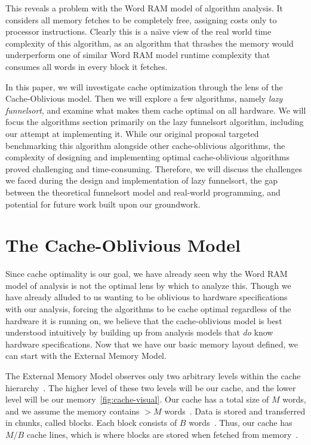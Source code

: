 \documentclass[11pt, letterpaper]{article}
\begin{document}
This reveals a problem with the Word RAM model of algorithm analysis. It considers all memory fetches to be completely free, assigning costs only to processor instructions. Clearly this is a na\"{\i}ve view of the real world time complexity of this algorithm, as an algorithm that thrashes the memory would underperform one of similar Word RAM model runtime complexity that consumes all words in every block it fetches.

In this paper, we will investigate cache optimization through the lens of the Cache-Oblivious model. Then we will explore a few algorithms, namely \textit{lazy funnelsort}, and examine what makes them cache optimal on all hardware. We will focus the algorithms section primarily on the lazy funnelsort algorithm, including our attempt at implementing it. While our original proposal targeted benchmarking this algorithm alongside other cache-oblivious algorithms, the complexity of designing and implementing optimal cache-oblivious algorithms proved challenging and time-consuming. Therefore, we will discuss the challenges we faced during the design and implementation of lazy funnelsort, the gap between the theoretical funnelsort model and real-world programming, and potential for future work built upon our groundwork.

\section{The Cache-Oblivious Model}

Since cache optimality is our goal, we have already seen why the Word RAM model of analysis is not the optimal lens by which to analyze this. Though we have already alluded to us wanting to be oblivious to hardware specifications with our analysis, forcing the algorithms to be cache optimal regardless of the hardware it is running on, we believe that the cache-oblivious model is best understood intuitively by building up from analysis models that \textit{do} know hardware specifications. Now that we have our basic memory layout defined, we can start with the External Memory Model.

The External Memory Model observes only two arbitrary levels within the cache hierarchy~\cite{demaine}. The higher level of these two levels will be our cache, and the lower level will be our memory~\ref{fig:cache-visual}. Our cache has a total size of $M$ words, and we assume the memory contains $> M$ words~\cite{demaine}. Data is stored and transferred in chunks, called blocks. Each block consists of $B$ words~\cite{demaine}. Thus, our cache has $M/B$ cache lines, which is where blocks are stored when fetched from memory~\cite{demaine}. 
\end{document}
